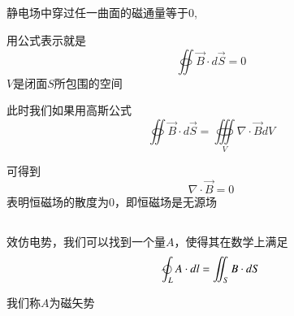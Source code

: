 \documentclass[lang=cn,10pt]{elegantbook}
\begin{document}
	\subsection{\color{red}}
	\begin{theorem}[高斯定理]
		静电场中穿过任一曲面的磁通量等于0,
		
		用公式表示就是
		\begin{equation*}
			\oiint{\overrightarrow{B}\cdot d\overrightarrow{S}}=0
		\end{equation*}
		$V$是闭面$S$所包围的空间
	\end{theorem}
	\begin{note}
		此时我们如果用高斯公式
		\begin{equation*}
			\oiint{\overrightarrow{B}\cdot d\overrightarrow{S}}=\oiiint\limits_V{\nabla \cdot \overrightarrow{B}dV}
		\end{equation*}
		
		可得到
		\begin{equation*}
			\nabla \cdot \overrightarrow{B}=0
		\end{equation*}
		表明恒磁场的散度为0，即恒磁场是无源场
	\end{note}
		\subsection{\color{red}}
		
		\begin{definition}
			效仿电势，我们可以找到一个量$A$，使得其在数学上满足
			\begin{equation*}
				\ointclockwise_L{A\cdot dl}=\iint_S{B\cdot dS}
			\end{equation*}
			
			我们称$A$为磁矢势
		\end{definition}
		
\end{document}
